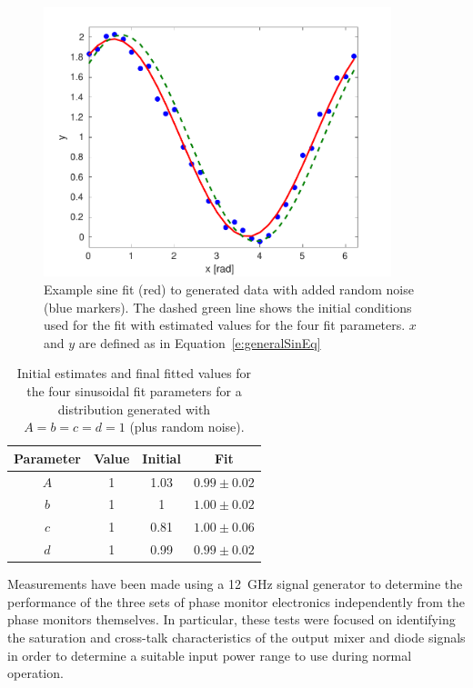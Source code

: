 \begin{figure}
  \centering
  \includegraphics[width=0.9\textwidth]{Figures/phaseMons/sinFitEx}
  \caption{Example sine fit (red) to generated data with added random noise (blue markers). The dashed green line shows the initial conditions used for the fit with estimated values for the four fit parameters. \(x\) and \(y\) are defined as in Equation~\ref{e:generalSinEq}}
  \label{f:sinFitEx}
\end{figure}

\begin{table}
  \begin{center}
    \begin{tabular}{|c c c c|}
	   \hline
       Parameter & Value & Initial & Fit \\ \hline
       \(A\) & 1 & 1.03 & \(0.99\pm0.02\)\\
       \(b\) & 1 & 1 & \(1.00\pm0.02\) \\
       \(c\) & 1 & 0.81 & \(1.00\pm0.06\) \\
       \(d\) & 1 & 0.99 & \(0.99\pm0.02\) \\ \hline
    \end{tabular}
    \caption{Initial estimates and final fitted values for the four sinusoidal fit parameters for a distribution generated with \(A = b = c = d = 1\) (plus random noise).}
  	\label{t:sinFitEx}
  \end{center}
\end{table}


Measurements have been made using a 12~GHz signal generator to determine the performance of the three sets of phase monitor electronics independently from the phase monitors themselves. In particular, these tests were focused on identifying the saturation and cross-talk characteristics of the output mixer and diode signals in order to determine a suitable input power range to use during normal operation.

